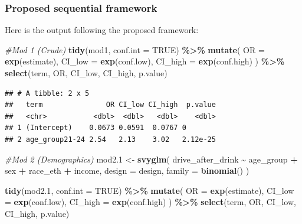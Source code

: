 \documentclass[
]{article}
\newenvironment{Shaded}{\begin{snugshade}}{\end{snugshade}}
\newcommand{\AttributeTok}[1]{\textcolor[rgb]{0.13,0.29,0.53}{#1}}
\newcommand{\CommentTok}[1]{\textcolor[rgb]{0.56,0.35,0.01}{\textit{#1}}}
\newcommand{\ConstantTok}[1]{\textcolor[rgb]{0.56,0.35,0.01}{#1}}
\newcommand{\FloatTok}[1]{\textcolor[rgb]{0.00,0.00,0.81}{#1}}
\newcommand{\FunctionTok}[1]{\textcolor[rgb]{0.13,0.29,0.53}{\textbf{#1}}}
\newcommand{\NormalTok}[1]{#1}
\newcommand{\OtherTok}[1]{\textcolor[rgb]{0.56,0.35,0.01}{#1}}
\newcommand{\SpecialCharTok}[1]{\textcolor[rgb]{0.81,0.36,0.00}{\textbf{#1}}}
\begin{document}
\subsubsection{Proposed sequential
framework}\label{proposed-sequential-framework}

Here is the output following the proposed framework:

\begin{Shaded}
\begin{Highlighting}[]
\CommentTok{\#Mod 1 (Crude)}
\FunctionTok{tidy}\NormalTok{(mod1, }\AttributeTok{conf.int =} \ConstantTok{TRUE}\NormalTok{) }\SpecialCharTok{\%\textgreater{}\%}
  \FunctionTok{mutate}\NormalTok{(}
    \AttributeTok{OR =} \FunctionTok{exp}\NormalTok{(estimate),}
    \AttributeTok{CI\_low =} \FunctionTok{exp}\NormalTok{(conf.low),}
    \AttributeTok{CI\_high =} \FunctionTok{exp}\NormalTok{(conf.high)}
\NormalTok{  ) }\SpecialCharTok{\%\textgreater{}\%}
  \FunctionTok{select}\NormalTok{(term, OR, CI\_low, CI\_high, p.value) }
\end{Highlighting}
\end{Shaded}

\begin{verbatim}
## # A tibble: 2 x 5
##   term               OR CI_low CI_high  p.value
##   <chr>           <dbl>  <dbl>   <dbl>    <dbl>
## 1 (Intercept)    0.0673 0.0591  0.0767 0       
## 2 age_group21-24 2.54   2.13    3.02   2.12e-25
\end{verbatim}

\begin{Shaded}
\begin{Highlighting}[]
\CommentTok{\#Mod 2 (Demographics)  }
\NormalTok{mod2}\FloatTok{.1} \OtherTok{\textless{}{-}} \FunctionTok{svyglm}\NormalTok{(}
\NormalTok{  drive\_after\_drink }\SpecialCharTok{\textasciitilde{}}\NormalTok{ age\_group }\SpecialCharTok{+}\NormalTok{ sex }\SpecialCharTok{+}\NormalTok{ race\_eth }\SpecialCharTok{+}\NormalTok{ income,}
  \AttributeTok{design =}\NormalTok{ design,}
  \AttributeTok{family =} \FunctionTok{binomial}\NormalTok{()}
\NormalTok{) }

\FunctionTok{tidy}\NormalTok{(mod2}\FloatTok{.1}\NormalTok{, }\AttributeTok{conf.int =} \ConstantTok{TRUE}\NormalTok{) }\SpecialCharTok{\%\textgreater{}\%}
  \FunctionTok{mutate}\NormalTok{(}
    \AttributeTok{OR =} \FunctionTok{exp}\NormalTok{(estimate),}
    \AttributeTok{CI\_low =} \FunctionTok{exp}\NormalTok{(conf.low),}
    \AttributeTok{CI\_high =} \FunctionTok{exp}\NormalTok{(conf.high)}
\NormalTok{  ) }\SpecialCharTok{\%\textgreater{}\%}
  \FunctionTok{select}\NormalTok{(term, OR, CI\_low, CI\_high, p.value)}
\end{Highlighting}
\end{Shaded}
\end{document}

